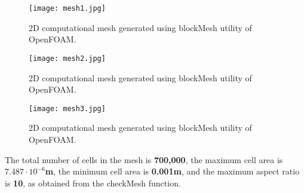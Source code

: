 \documentclass[a4paper]{article}
\begin{document}
\begin{figure}[H]
    \centering
    \texttt{[image: mesh1.jpg]}
    \caption{\small 2D computational mesh generated using blockMesh utility of OpenFOAM.}
    \label{fig:mesh1}
\end{figure} 
\vspace{0.3cm}
\begin{figure}[H]
    \centering
    \texttt{[image: mesh2.jpg]}
    \caption{\small 2D computational mesh generated using blockMesh utility of OpenFOAM.}
    \label{fig:mesh1}
\end{figure} 
\vspace{0.3cm}
\begin{figure}[H]
    \centering
    \texttt{[image: mesh3.jpg]}
    \caption{\small 2D computational mesh generated using blockMesh utility of OpenFOAM.}
    \label{fig:mesh1}
\end{figure} 
\vspace{0.3cm}

The total number of cells in the mesh is \textbf{700,000}, the maximum cell area is \textbf{$7.487 \cdot 10^{-6}$m}, the minimum cell area is \textbf{0.001m}, and the maximum aspect ratio is \textbf{10}, as obtained from the checkMesh function.
\end{document}
